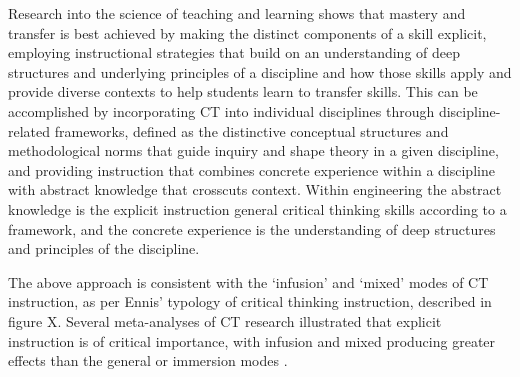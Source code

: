 Research into the science of teaching and learning shows that mastery and transfer is best achieved by making the distinct components of a skill explicit, employing instructional strategies that build on an understanding of deep structures and underlying principles of a discipline and how those skills apply and provide diverse contexts to help students learn to transfer skills. This can be accomplished by incorporating CT into individual disciplines through discipline-related frameworks, defined as the distinctive conceptual structures and methodological norms that guide inquiry and shape theory in a given discipline, and providing instruction that combines concrete experience within a discipline with abstract knowledge that crosscuts context\cite{Ambrose:2010uh}. Within engineering the abstract knowledge is the explicit instruction general critical thinking skills according to a framework, and the concrete experience is the understanding of deep structures and principles of the discipline\cite{Smith:2002df}.  

The above approach is consistent with the ‘infusion’ and ‘mixed’ modes of CT instruction, as per Ennis’ typology of critical thinking instruction, described in figure X.  Several meta-analyses of CT research illustrated that explicit instruction is of critical importance, with infusion and mixed producing greater effects than the general or immersion modes \cite{Abrami:2014cs, BeharHorenstein:2011tf, Abrami:2008ew}.  